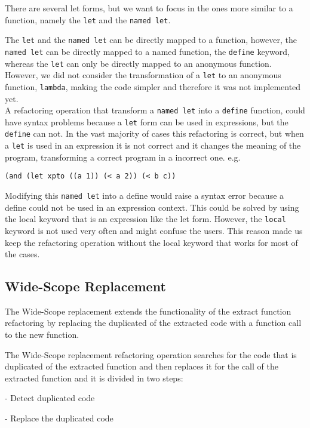 There are several let forms, but we want to focus in the ones more similar to
a function, namely the {\tt let} and the {\tt named let}.

The {\tt let} and the {\tt named let} can be directly mapped to a function, however, the {\tt named let}
 can be directly mapped to a named function, the {\tt define} keyword, whereas the {\tt let} can only be directly mapped
to an anonymous function.
However, we did not consider the transformation of a {\tt let} to an anonymous function, {\tt lambda},
making the code simpler and therefore it was not implemented yet.\\


A refactoring operation that transform a {\tt named let} into a {\tt define} function,
 could have syntax problems because a {\tt let} form can be used in expressions, but the {\tt define} can not.
In the vast majority of cases this refactoring is correct, but when a {\tt let} is used in an expression
it is not correct and it changes the meaning of the program, transforming a correct
program in a incorrect one.
e.g.
\begin{lstlisting}[basicstyle=\ttfamily, caption=Let in an expression]
(and (let xpto ((a 1)) (< a 2)) (< b c))
\end{lstlisting}
Modifying this {\tt named let} into a define would raise a syntax error because a
define could not be used in an expression context.
This could be solved by using the local keyword that is an expression like
the let form.
However, the {\tt local} keyword is not used very often and might confuse the users.
This reason made us keep the refactoring operation without the local keyword that works for
most of the cases.


\subsection{Wide-Scope Replacement} %
The Wide-Scope replacement extends the functionality of the extract function refactoring
by replacing the duplicated of the extracted code with a function call to the new function.


The Wide-Scope replacement refactoring operation searches for the code that is duplicated of the extracted
function and then replaces it for the call of the
extracted function and it is divided in two steps: %

- Detect duplicated code

- Replace the duplicated code

